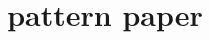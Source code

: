 \documentclass[12pt]{report}
\theoremstyle{slplain}
\numberwithin{thm}{section}
\begin{document}
 
\title{pattern paper}
\maketitle


%

%





\end{document}
